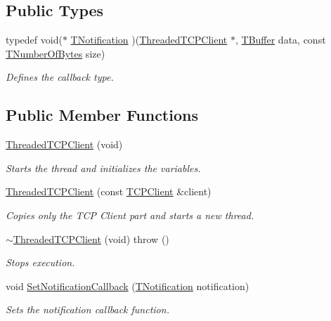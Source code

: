 \subsection*{Public Types}
\begin{DoxyCompactItemize}
\item 
typedef void($\ast$ \hyperlink{class_threaded_t_c_p_client_a67efb980455f9da4cdecd46eebbbb568}{T\-Notification} )(\hyperlink{class_threaded_t_c_p_client}{Threaded\-T\-C\-P\-Client} $\ast$, \hyperlink{class_socket_base_a1557d64029a25c20b4c306b80efcc143}{T\-Buffer} data, const \hyperlink{class_socket_base_ac414903631491453b96e71c06c2c2e72}{T\-Number\-Of\-Bytes} size)
\begin{DoxyCompactList}\small\item\em Defines the callback type. \end{DoxyCompactList}\end{DoxyCompactItemize}
\subsection*{Public Member Functions}
\begin{DoxyCompactItemize}
\item 
\hyperlink{class_threaded_t_c_p_client_aee05df10793942b468883521a5bcc666}{Threaded\-T\-C\-P\-Client} (void)
\begin{DoxyCompactList}\small\item\em Starts the thread and initializes the variables. \end{DoxyCompactList}\item 
\hyperlink{class_threaded_t_c_p_client_a79bb042d9ffb617c8da0dcef486d7a07}{Threaded\-T\-C\-P\-Client} (const \hyperlink{class_t_c_p_client}{T\-C\-P\-Client} \&client)
\begin{DoxyCompactList}\small\item\em Copies only the T\-C\-P Client part and starts a new thread. \end{DoxyCompactList}\item 
\hyperlink{class_threaded_t_c_p_client_a54cabf8982b04e30fa81189bbeeab5d8}{$\sim$\-Threaded\-T\-C\-P\-Client} (void)  throw ()
\begin{DoxyCompactList}\small\item\em Stops execution. \end{DoxyCompactList}\item 
void \hyperlink{class_threaded_t_c_p_client_a46f301432b075ae8ce3928cb8635a546}{Set\-Notification\-Callback} (\hyperlink{class_threaded_t_c_p_client_a67efb980455f9da4cdecd46eebbbb568}{T\-Notification} notification)
\begin{DoxyCompactList}\small\item\em Sets the notification callback function. \end{DoxyCompactList}\end{DoxyCompactItemize}
